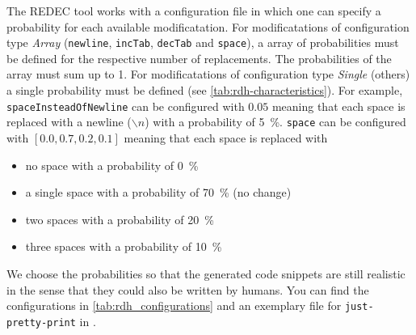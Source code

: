 \documentclass[%
class=scrreprt,
chapterprefix=false,%
open=right,%
twoside=false,%
paper=a4,%
logofile={Logo\_zentral\_farbig\_EN.png},%
thesistype=master,%
UKenglish,%
]{se2thesis}
\theoremstyle{definition}
\newcommand{\mod}{modificatation\xspace}
\newcommand{\mods}{modificatations\xspace}
\newcommand{\RDH}{Readability Decreaser\xspace}
\newcommand{\rdh}{REDEC\xspace}
\newcommand{\RDHa}{\RDH (\rdh)\xspace} %
\newcommand{\none}{just-pretty-print\xspace} %
\newcommand{\nonet}{\texttt{\none}\xspace} %
\begin{document}
	
	The \rdh tool works with a configuration file in which one can specify a probability for each available \mod.
	For \mods of configuration type \textit{Array} (\texttt{newline}, \texttt{incTab}, \texttt{decTab} and \texttt{space}), a array of probabilities must be defined for the respective number of replacements. The probabilities of the array must sum up to 1.
	For \mods of configuration type \textit{Single} (others) a single probability must be defined (see \autoref{tab:rdh-characteristics}).
	For example, \texttt{spaceInsteadOfNewline} can be configured with $0.05$ meaning that each space is replaced with a newline ($\backslash n$) with a probability of 5~\%.
	\texttt{space} can be configured with $[0.0, 0.7, 0.2, 0.1]$ meaning that each space is replaced with
	\begin{itemize}
		\item no space with a probability of 0~\%
		\item a single space with a probability of 70~\% (no change)
		\item two spaces with a probability of 20~\%
		\item three spaces with a probability of 10~\% 
	\end{itemize}
		
	We choose the probabilities so that the generated code snippets are still realistic in the sense that they could also be written by humans. You can find the configurations in \autoref{tab:rdh_configurations} and an exemplary file for \nonet in .
	
\end{document}
